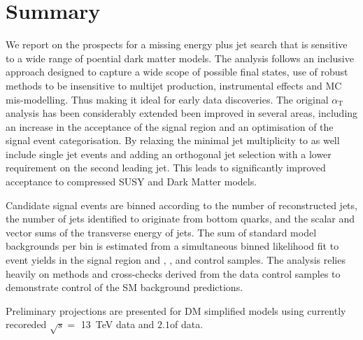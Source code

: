 \section{Summary}
\label{sec:summary}

We report on the prospects for a missing energy plus jet search that
is sensitive to a wide range of poential dark matter models.
The analysis follows an inclusive approach designed to capture a wide
scope of possible final states, use of robust methods to be
insensitive to multijet production, instrumental effects and MC
mis-modelling. Thus making it ideal for early data discoveries.
The original $\alpha_\textrm{T}$ analysis has been considerably extended  been improved in several areas, 
including an increase in the acceptance of the signal region and an optimisation of
the signal event categorisation. By relaxing the minimal jet multiplicity 
to as well include single jet events and adding an orthogonal jet selection with a lower 
\Pt requirement on the second leading jet. This leads to 
significantly improved acceptance to compressed SUSY and Dark Matter
models.

Candidate signal events are binned according to the number of
reconstructed jets, the number of jets identified to originate from
bottom quarks, and the scalar and vector sums of the transverse energy
of jets. The sum of standard model backgrounds per bin is estimated
from a simultaneous binned likelihood fit to event yields in the
signal region and \mj, \mmj, and \gj control samples. The
analysis relies heavily on methods and cross-checks derived from the
data control samples to demonstrate control of the SM background
predictions. 


Preliminary projections are presented for DM
simplified models using currently recoreded $\sqrt{s} =$ 13~TeV data and $2.1$\ifb of data.

